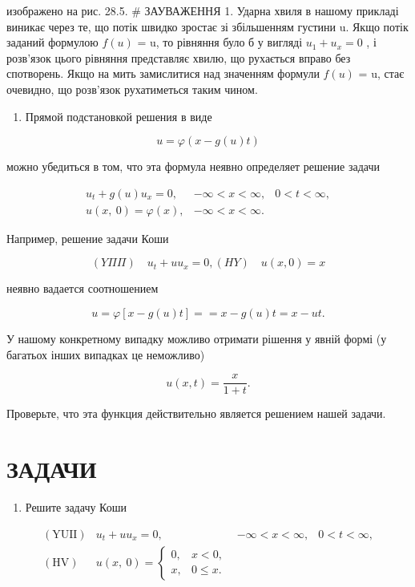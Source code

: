 \documentclass[
  ukrainian,
]{article}
\providecommand{\tightlist}{%
  \setlength{\itemsep}{0pt}\setlength{\parskip}{0pt}}
\begin{document}
изображено на рис. 28.5. \# ЗАУВАЖЕННЯ 1. Ударна хвиля в нашому прикладі
виникає через те, що потік швидко зростає зі збільшенням густини u. Якщо
потік заданий формулою \(f(u)\) = u, то рівняння було б у вигляді
\(u_1+u_x=0\) , і розв'язок цього рівняння представляє хвилю, що
рухається вправо без спотворень. Якщо на мить замислитися над значенням
формули \(f(u)\) = u, стає очевидно, що розв'язок рухатиметься таким
чином.

\begin{enumerate}
\def\labelenumi{\arabic{enumi}.}
\setcounter{enumi}{1}
\tightlist
\item
  Прямой подстановкой решения в виде
\end{enumerate}

\[
u = \varphi(x - g(u) t)
\]

можно убедиться в том, что эта формула неявно определяет решение задачи

\[
\begin{array}{lll} u_t + g\left(u\right) u_x = 0, & -\infty < x < \infty, & 0 < t < \infty, \\ u\left(x, \ 0\right) = \varphi\left(x\right), & -\infty < x < \infty. \end{array}
\]

Например, решение задачи Коши

\[
(Y\Pi\Pi) \quad u_t + uu_x = 0,
(HY) \quad u(x, 0) = x
\]

неявно вадается соотношением

\[
u = \varphi [x - g(u) t] =
= x - g(u) t = x - ut.
\]

У нашому конкретному випадку можливо отримати рішення у явній формі (у
багатьох інших випадках це неможливо)

\[
u(x, t) = \frac{x}{1+t}.
\]

Проверьте, что эта функция действительно является решением нашей задачи.

\section{\texorpdfstring{\textbf{ЗАДАЧИ}}{ЗАДАЧИ}}\label{ux437ux430ux434ux430ux447ux438}

\begin{enumerate}
\def\labelenumi{\arabic{enumi}.}
\tightlist
\item
  Решите задачу Коши
\end{enumerate}

\[
\begin{array}{lll} (\text{YUII}) & u_t + uu_x = 0, & -\infty < x < \infty, & 0 < t < \infty, \\ (\text{HV}) & u(x, \ 0) = \begin{cases} 0, & x < 0, \\ x, & 0 \leqslant x. \end{cases} \end{array}
\]
\end{document}
